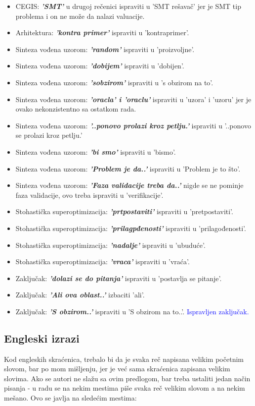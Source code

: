 \documentclass[a4paper]{report}
\newcommand{\odgovor}[1]{\textcolor{blue}{#1}}
\begin{document}
\begin{itemize}
    \item CEGIS: \textbf{\textit{'SMT'}} u drugoj rečenici ispraviti u 'SMT rešavač' jer je SMT tip problema i on ne može da nalazi valuacije.
    \item Arhitektura: \textbf{\textit{'kontra primer'}} ispraviti u 'kontraprimer'.
    \item Sinteza vođena uzorom: \textbf{\textit{'random'}} ispraviti u 'proizvoljne'.
    \item Sinteza vođena uzorom: \textbf{\textit{'dobijem'}} ispraviti u 'dobijen'.
    \item Sinteza vođena uzorom: \textbf{\textit{'sobzirom'}} ispraviti u 's obzirom na to'.
    \item Sinteza vođena uzorom: \textbf{\textit{'oracla' i 'oraclu'}} ispraviti u 'uzora' i 'uzoru' jer je ovako nekonzistentno sa ostatkom rada.
    \item Sinteza vođena uzorom: \textbf{\textit{'..ponovo prolazi kroz petlju.'}} ispraviti u '..ponovo se prolazi kroz petlju.'
    \item Sinteza vođena uzorom: \textbf{\textit{'bi smo'}} ispraviti u 'bismo'.
    \item Sinteza vođena uzorom: \textbf{\textit{'Problem je da..'}} ispraviti u 'Problem je to što'.
    \item Sinteza vođena uzorom: \textbf{\textit{'Faza validacije treba da..'}} nigde se ne pominje faza validacije, ovo treba ispraviti u 'verifikacije'.
    \item Stohastička superoptimizacija: \textbf{\textit{'prtpostaviti'}} ispraviti u 'pretpostaviti'.
    \item Stohastička superoptimizacija: \textbf{\textit{'prilagpđenosti'}} ispraviti u 'prilagođenosti'.
    \item Stohastička superoptimizacija: \textbf{\textit{'nadalje'}} ispraviti u 'ubuduće'.
    \item Stohastička superoptimizacija: \textbf{\textit{'vraca'}} ispraviti u 'vraća'.
    \item Zaključak: \textbf{\textit{'dolazi se do pitanja'}} ispraviti u 'postavlja se pitanje'.
    \item Zaključak: \textbf{\textit{'Ali ova oblast..'}} izbaciti 'ali'.
    \item Zaključak: \textbf{\textit{'S obzirom..'}} ispraviti u 'S obzirom na to..'.
    \odgovor {Ispravljen zaključak.}
\end{itemize}

\subsection{Engleski izrazi}
Kod engleskih skraćenica, trebalo bi da je svaka reč napisana velikim početnim slovom, bar po mom mišljenju, jer je već sama skraćenica zapisana velikim slovima. Ako se autori ne slažu sa ovim predlogom, bar treba ustaliti jedan način pisanja - u radu se na nekim mestima piše svaka reč velikim slovom a na nekim mešano. Ovo se javlja na sledećim mestima:
\end{document}
